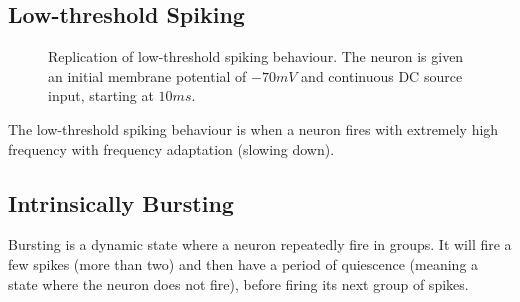 \documentclass[12pt]{scrreprt}
\begin{document}
\subsection{Low-threshold Spiking}
\label{subsec:LTS}
\begin{figure}[H]
\centering
{}
\caption{Replication of low-threshold spiking behaviour.
The neuron is given an initial membrane potential of $-70mV$ and continuous DC source input, starting at $10ms$.}
\label{fig:LTS}
\end{figure} 

The low-threshold spiking behaviour is when a neuron fires with extremely high frequency with frequency adaptation (slowing down).

\subsection{Intrinsically Bursting}
\label{subsec:IB}
Bursting is a dynamic state where a neuron repeatedly fire in groups. 
It will fire a few spikes (more than two) and then have a period of quiescence (meaning a state where the neuron does not fire), before firing its next group of spikes. 
\end{document}
